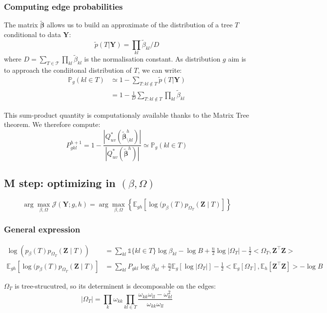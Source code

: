 \documentclass[11pt,a4paper]{article}
\newcommand{\argmax}{\arg\!\max}
\newcommand{\betabf}{\boldsymbol{\beta}}
\newcommand{\Ybf}{\boldsymbol{Y}}
\newcommand{\Zbf}{\boldsymbol{Z}}
\newcommand{\Esp}{\mathds{E}}
\begin{document}
\subsubsection{Computing edge probabilities}
The matrix $\widetilde{\betabf}$ allows us to build an approximate of the distribution of a tree $T$ conditional to  data $\Ybf$:
$$\tilde{p}(T|\Ybf) = \prod_{kl} \widetilde{\beta}_{kl} \big/ D $$
where $D = \sum_{T\in \mathcal{T}}\prod_{kl} \widetilde{\beta}_{kl}$ is the normalisation constant. As distribution $g$ aim is to approach the condiitonal distribution of $T$, we can write:
\begin{align*}
\mathds{P}_g(kl \in T) &\simeq 1 - \sum_{T : kl \notin T}  \tilde{p}(T|\Ybf)\\
&= 1 - \frac{1}{D} \sum_{T : kl \notin T}\prod_{kl} \widetilde{\beta}_{kl}
\end{align*}

This sum-product quantity is computationaly available thanks to the Matrix Tree theorem. We therefore compute:
$$\boxed{P_{gkl}^{h+1} = 1 - \dfrac{|Q_{uv}^*(\widetilde{\betabf}_{\setminus kl}^h)|}{|Q_{uv}^*(\widetilde{\betabf}^h)|} \simeq\mathds{P}_g(kl \in T)}$$

\subsection{M step: optimizing in $(\beta, \Omega)$}
 
$$ \argmax_{\beta, \Omega} \mathcal{J}(\Ybf ; g,h) =\argmax_{\beta, \Omega} \left\{ \Esp_{gh} [\log (p_\beta(T)p_{\Omega_T}(\Zbf\mid T) ]\right\} $$

\subsubsection{General expression}
\begin{align*}
\log (p_\beta(T)p_{\Omega_T}(\Zbf\mid T))  &= \sum_{kl} \mathds{1}\{kl \in T\} \log \beta_{kl} - \log B + \frac{n}{2}\log |\Omega_T| - \frac{1}{2}<\Omega_T,\Zbf^\intercal \Zbf>\\
\Esp_{gh} [\log (p_\beta(T)p_{\Omega_T}(\Zbf\mid T) ] &= \sum_{kl} P_{gkl} \log\beta_{kl} +\frac{n}{2} \Esp_g[\log |\Omega_T|] -\frac{1}{2} <\Esp_g [\Omega_T], \Esp_h[\Zbf^\intercal \Zbf]>- \log B
\end{align*}

$\Omega_T$ is tree-strucutred, so its determinent is decomposable on the edges:
$$|\Omega_{T}| = \prod_{k} \omega_{kk} \prod_{kl \in T} \frac{\omega_{kk}\omega_{ll}-\omega_{kl}^2}{\omega_{kk}\omega_{ll}}$$
\end{document}
